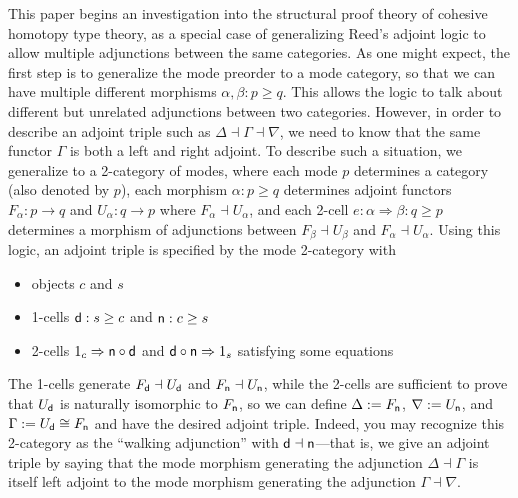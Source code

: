 \documentclass{drl-common/llncs}
\newcommand{\la}{\ensuremath{\dashv}}
\newcommand{\tc}[2]{\ensuremath{#1 \Rightarrow #2}}
\newcommand\compo[2]{\ensuremath{#1 \circ #2}}
\begin{document}
This paper begins an investigation into the structural proof theory of
cohesive homotopy type theory, as a special case of generalizing Reed's
adjoint logic to allow multiple adjunctions between the same categories.
As one might expect, the first step is to generalize the mode preorder
to a mode category, so that we can have multiple different morphisms
$\alpha, \beta : p\ge q$.  This allows the logic to talk about different
but unrelated adjunctions between two categories.  However, in order to
describe an adjoint triple such as $\Delta \la \Gamma \la \nabla$, we
need to know that the same functor $\Gamma$ is both a left and right
adjoint.  To describe such a situation, we generalize to a 2-category of
modes, where each mode $p$ determines a category (also denoted by $p$), each morphism $\alpha
: p \ge q$ determines adjoint functors $F_\alpha : p \to q$ and
$U_\alpha : q \to p$ where $F_\alpha \la U_\alpha$, and each 2-cell $e :
\tc \alpha  \beta : q \ge p$ determines a morphism of adjunctions between 
$F_\beta \la U_\beta$ and $F_\alpha \la U_\alpha$.  Using this logic, an
adjoint triple is specified by the mode 2-category with
\begin{itemize}
\item objects $c$ and $s$
\item 1-cells $\mathsf{d} : s \ge c$ and $\mathsf{n} : c \ge s$
\item 2-cells $\tc {1_c} {\compo{\dsd{n}}{\dsd{d}}}$ 
and $\tc {\compo{\dsd{d}}{\dsd{n}}} {1_s}$ satisfying 
some equations
\end{itemize}
The 1-cells generate $F_{\dsd d} \la U_{\dsd d}$ and $F_{\dsd n} \la
U_{\dsd n}$, while the 2-cells are sufficient to prove that $U_{\mathsf{d}}$ is
naturally isomorphic to $F_{\mathsf{n}}$, so we can define $\Delta :=
F_{\mathsf{n}}$, $\nabla := U_{\mathsf{n}}$, and $\Gamma := U_{\mathsf{d}} \cong F_{\mathsf{n}}$
and have the desired adjoint triple.  Indeed, you may recognize this
2-category as the ``walking adjunction'' with $\dsd d \la \dsd n$---that
is, we give an adjoint triple by saying that the mode morphism generating
the adjunction $\Delta\la \Gamma$ is itself left adjoint to the mode morphism generating the
adjunction $\Gamma\la\nabla$.
\end{document}
